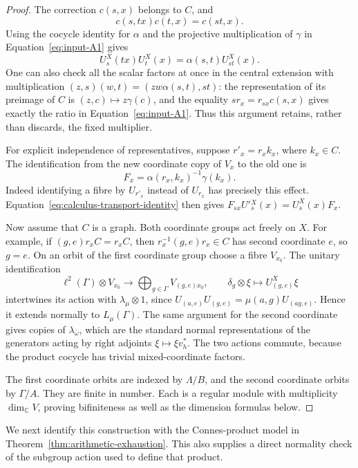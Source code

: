 \begin{proof}
The correction $c(s,x)$ belongs to $C$, and
\[
 c(s,tx)c(t,x)=c(st,x).
\]
Using the cocycle identity for $\alpha$ and the projective multiplication
of $\gamma$ in Equation~\eqref{eq:input-A1} gives
\begin{equation}\label{eq:calculus-transport-identity}
 U^X_s(tx)U^X_t(x)=\alpha(s,t)U^X_{st}(x).
\end{equation}
One can also check all the scalar factors at once in the central
extension with multiplication
$(z,s)(w,t)=(zw\alpha(s,t),st)$: the representation of its preimage
of $C$ is $(z,c)\mapsto z\gamma(c)$, and the equality
$sr_x=r_{sx}c(s,x)$ gives exactly the ratio in
Equation~\eqref{eq:input-A1}.  Thus this argument retains, rather than
discards, the fixed multiplier.

For explicit independence of representatives, suppose
$r'_x=r_xk_x$, where $k_x\in C$.  The identification from the new
coordinate copy of $V_x$ to the old one is
\[
 F_x=\alpha(r_x,k_x)^{-1}\gamma(k_x).
\]
Indeed identifying a fibre by $U_{r'_x}$ instead of $U_{r_x}$ has
precisely this effect.  Equation~\eqref{eq:calculus-transport-identity}
then gives $F_{sx}U'{}^X_s(x)=U^X_s(x)F_x$.

Now assume that $C$ is a graph.  Both coordinate groups act freely on
$X$.  For example, if $(g,e)r_xC=r_xC$, then
$r_x^{-1}(g,e)r_x\in C$ has second coordinate $e$, so $g=e$.
On an orbit of the first coordinate group choose a fibre $V_{x_0}$.
The unitary identification
\[
 \ell^2(\Gamma)\otimes V_{x_0}\longrightarrow
 \bigoplus_{g\in\Gamma}V_{(g,e)x_0},
 \qquad \delta_g\otimes\xi\longmapsto U^X_{(g,e)}\xi
\]
intertwines its action with $\lambda_\mu\otimes1$, since
$U_{(a,e)}U_{(g,e)}=\mu(a,g)U_{(ag,e)}$.  Hence it extends normally
to $L_\mu(\Gamma)$.  The same argument for the second coordinate
gives copies of $\lambda_{\bar\omega}$, which are the standard
normal representations of the generators acting by right adjoints
$\xi\mapsto\xi v_h^*$.  The two actions commute, because the product
cocycle has trivial mixed-coordinate factors.

The first coordinate orbits are indexed by $\Lambda/B$, and the
second coordinate orbits by $\Gamma/A$.  They are finite in number.
Each is a regular module with multiplicity $\dim_{\mathbb C}V$,
proving bifiniteness as well as the dimension formulas below.
\end{proof}

We next identify this construction with the Connes-product model in
Theorem~\ref{thm:arithmetic-exhaustion}.  This also supplies a direct normality
check of the subgroup action used to define that product.

